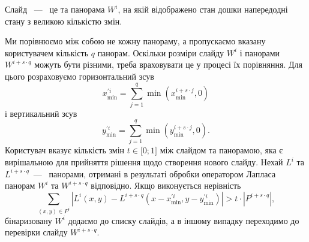 \begin{definition}
  Слайд ~---~ це та панорама \(W^{i}\), на якій відображено стан дошки
  напередодні стану з великою кількістю змін.
\end{definition}
Ми порівнюємо між собою не
кожну панораму, а пропускаємо вказану користувачем кількість \(q\)
панорам. Оскільки розміри слайду \(W^{i}\) і панорами
\(W^{i + s \cdot q}\) можуть бути різними, треба враховувати це у
процесі їх порівняння. Для цього розраховуємо горизонтальний зсув
$$x_{\min}^{'i} = \sum_{j = 1}^{q}{\min\left( x_{\min}^{i + s \cdot j},0 \right)}$$
і вертикальний зсув
$$y_{\min}^{'i} = \sum_{j = 1}^{q}{\min\left( y_{\min}^{i + s \cdot j},0 \right)}.$$
Користувач вказує кількість змін \(t \in \lbrack 0;1\rbrack\) між
слайдом та панорамою, яка є вирішальною для прийняття рішення щодо
створення нового слайду. Нехай \(L^{i}\) та \(L^{i + s \cdot q}\)~---~
панорами, отримані в результаті обробки оператором Лапласа панорам \(W^{i}\) та
\(W^{i + s \cdot q}\) відповідно. Якщо виконується нерівність
\begin{equation*}
  \sum_{(x,y) \in P^{i}}^{}| L^{i}(x,y) - L^{i + s \cdot q}( x - x_{\min}^{'i},y - y_{\min}^{'i} ) | > t \cdot | P^{i + s \cdot q} |,
\end{equation*}
бінаризовану \(W^{i}\) додаємо до списку слайдів, а в іншому випадку переходимо до
перевірки слайду \(W^{i + s \cdot q}\).
